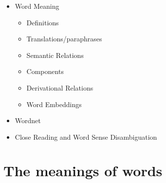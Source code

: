 \documentclass[a4paper,landscape,headrule,footrule,xetex]{foils}
\begin{document}
\maketitle

%


\begin{itemize}
\item Word Meaning
  \begin{itemize}
  \item Definitions
  \item Translations/paraphrases
  \item Semantic Relations
  \item Components
  \item Derivational Relations
  \item Word Embeddings
  \end{itemize}
\item Wordnet
\item Close Reading and Word Sense Disambiguation
\end{itemize}

\section{The meanings of words}
 \MyLogo{}
\end{document}
